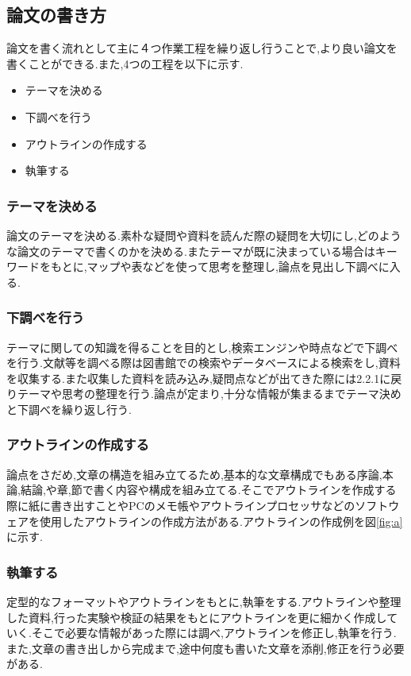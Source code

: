 \documentclass[a4j,12pt]{jarticle}
\begin{document}
\subsection{論文の書き方}
論文を書く流れとして主に４つ作業工程を繰り返し行うことで,より良い論文を書くことができる.また,4つの工程を以下に示す.
\begin{itemize}
  \item テーマを決める
  \item 下調べを行う
  \item アウトラインの作成する
  \item 執筆する
\end{itemize}
\subsubsection{テーマを決める}
論文のテーマを決める.素朴な疑問や資料を読んだ際の疑問を大切にし,どのような論文のテーマで書くのかを決める.またテーマが既に決まっている場合はキーワードをもとに,マップや表などを使って思考を整理し,論点を見出し下調べに入る.

\subsubsection{下調べを行う}
テーマに関しての知識を得ることを目的とし,検索エンジンや時点などで下調べを行う.文献等を調べる際は図書館での検索やデータベースによる検索をし,資料を収集する.また収集した資料を読み込み,疑問点などが出てきた際には2.2.1に戻りテーマや思考の整理を行う.論点が定まり,十分な情報が集まるまでテーマ決めと下調べを繰り返し行う.

\subsubsection{アウトラインの作成する}
論点をさだめ,文章の構造を組み立てるため,基本的な文章構成でもある序論,本論,結論,や章,節で書く内容や構成を組み立てる.そこでアウトラインを作成する際に紙に書き出すことやPCのメモ帳やアウトラインプロセッサなどのソフトウェアを使用したアウトラインの作成方法がある.アウトラインの作成例を図\ref{fig:a}に示す.

\subsubsection{執筆する}
定型的なフォーマットやアウトラインをもとに,執筆をする.アウトラインや整理した資料,行った実験や検証の結果をもとにアウトラインを更に細かく作成していく.そこで必要な情報があった際には調べ,アウトラインを修正し,執筆を行う.
また,文章の書き出しから完成まで,途中何度も書いた文章を添削,修正を行う必要がある.
\end{document}
